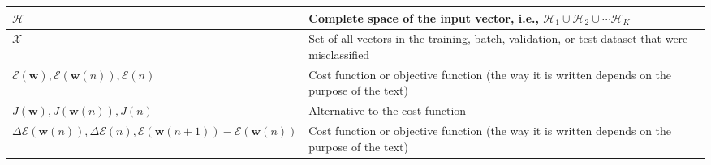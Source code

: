 \begin{xltabular}{\textwidth}{XX}
	\(\mathscr{H}\)                                                                                                                                                                & Complete space of the input vector, i.e., \(\mathscr{H}_1 \cup \mathscr{H}_2 \cup \cdots \mathscr{H}_K \)                                                                                                                                                                                                                              \\ \hline
	\(\mathscr{X}\) \cite{haykinNeuralNetworksLearning2009}                                                                                                                        & Set of all vectors in the training, batch, validation, or test dataset that were misclassified                                                                                                                                                                                                                                         \\ \hline
	\(\mathscr{E}(\mathbf{w}), \mathscr{E}(\mathbf{w}(n)), \mathscr{E}(n)\)                                                                                                        & Cost function or objective function (the way it is written depends on the purpose of the text)                                                                                                                                                                                                                                         \\ \hline
	\(J(\mathbf{w}), J(\mathbf{w}(n)), J(n)\)                                                                                                                                      & Alternative to the cost function                                                                                                                                                                                                                                                                                                       \\ \hline
	\(\Delta\mathscr{E}(\mathbf{w}(n)), \Delta\mathscr{E}(n), \mathscr{E}(\mathbf{w}(n+1)) - \mathscr{E}(\mathbf{w}(n))\)                                                          & Cost function or objective function (the way it is written depends on the purpose of the text)                                                                                                                                                                                                                                         \\ \hline

\end{xltabular}
